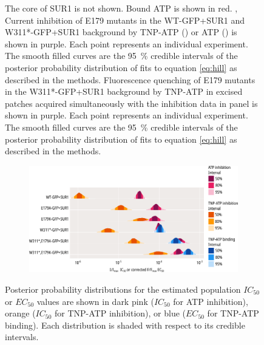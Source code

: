 \begin{figure}[h]
{	The core of SUR1 is not shown.
	Bound ATP is shown in red.
	,  Current inhibition of E179 mutants in the WT-GFP+SUR1 and W311*-GFP+SUR1 background by TNP-ATP () or ATP () is shown in purple.
	Each point represents an individual experiment.
	The smooth filled curves are the \SI{95}{\percent} credible intervals of the posterior probability distribution of fits to equation \ref{eq:hill} as described in the methods.
	 Fluorescence quenching of E179 mutants in the W311*-GFP+SUR1 background by TNP-ATP in excised patches acquired simultaneously with the inhibition data in panel  is shown in purple.
	Each point represents an individual experiment.
	The smooth filled curves are the \SI{95}{\percent} credible intervals of the posterior probability distribution of fits to equation \ref{eq:hill} as described in the methods.
	}\label{ch5fig:e179_1}
\end{figure}

\begin{figure}[h]
	\centering
	\begin{subfigure}[t]{0.9\textwidth}
		\caption{}\label{ch5fig:e179_ec50_fits}
		\centering
		\includegraphics[width=\textwidth]{e179_5.pdf}
	\end{subfigure}
	\caption[E179 mutations $EC_{50}$ parameters]{
	 Posterior probability distributions for the estimated population $IC_{50}$ or $EC_{50}$ values are shown in dark pink ($IC_{50}$ for ATP inhibition), orange ($IC_{50}$ for TNP-ATP inhibition), or blue ($EC_{50}$ for TNP-ATP binding).
	Each distribution is shaded with respect to its credible intervals.
	}\label{ch5fig:e179_1a}
\end{figure}


